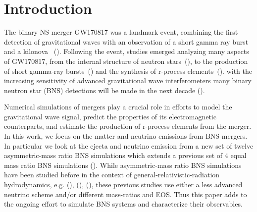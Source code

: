 \section{Introduction}


The binary NS merger GW170817 was a landmark event, combining the first detection of gravitational waves
with an observation of a short gamma ray burst and a kilonova ~(\cite{theligoscientific:2017qsa,gbm:2017lvd,2017apj...848l..13a,ajello2018fermi}). Following the event, studies emerged analyzing many aspects of GW170817, from the
internal structure of neutron stars~(\cite{read:2008iy,delpozzo:13,lackey2014,gw170817-nsradius,gw170817-pe}), to the production of short gamma-ray bursts~(\cite{moch:93,lee1999a,janka1999,gbm:2017lvd,2017apj...848l..13a,2018natur.561..355m}) and the synthesis of r-process elements~(\cite{  li:1998bw,1976apj...210..549l,rosswog:1998hy, 2005astro.ph.10256k,2010mnras.406.2650m,metzger2017,2017sci...358.1559k,2017sci...358.1556c,2017apj...848l..19c,2017sci...358.1556c,cowperthwaite:2017dyu,2017natur.551...80k,2017sci...358.1583k,2017apj...848l..32m,2017apj...848l..18n,2017natur.551...67p,2017natur.551...75s,2017apj...848l..16s,2017apj...848l..27t,2017sci...358.1565e}). with the increasing sensitivity of advanced gravitational wave
interferometers many binary neutron star (BNS) detections will
be made in the next decade (\cite{ligo2018gwtc}).

Numerical simulations of mergers
play a crucial role in efforts to model the gravitational
wave signal, predict the properties of its electromagnetic counterparts,
and estimate the production of r-process elements from the merger. In this work, we
focus on the matter and neutrino emissions from BNS mergers. In particular we look at the ejecta
and neutrino emission from a new set of twelve asymmetric-mass ratio BNS simulations
which extends a previous set of 4 equal mass ratio BNS simulations (\cite{foucart:2015gaa}). While asymmetric-mass ratio
BNS simulations have been studied before in the context of general-relativistic-radiation
hydrodynamics, e.g. (\cite{sekiguchi2016dynamical}), (\cite{lehner2016unequal}), (\cite{radice2016dynamical}),
these previous studies use either a less advanced neutrino scheme and/or
different mass-ratios and EOS. Thus this paper adds to the ongoing effort to simulate
BNS systems and characterize their observables.

